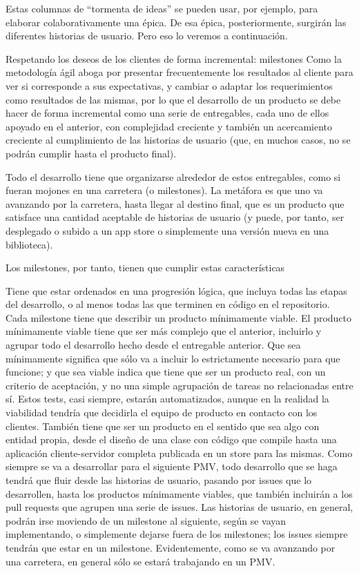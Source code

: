 Estas columnas de “tormenta de ideas” se pueden usar, por ejemplo, para elaborar colaborativamente una épica. De esa épica, posteriormente, surgirán las diferentes historias de usuario. Pero eso lo veremos a continuación.

Respetando los deseos de los clientes de forma incremental: milestones
Como la metodología ágil aboga por presentar frecuentemente los resultados al cliente para ver si corresponde a sus expectativas, y cambiar o adaptar los requerimientos como resultados de las mismas, por lo que el desarrollo de un producto se debe hacer de forma incremental como una serie de entregables, cada uno de ellos apoyado en el anterior, con complejidad creciente y también un acercamiento creciente al cumplimiento de las historias de usuario (que, en muchos casos, no se podrán cumplir hasta el producto final).

Todo el desarrollo tiene que organizarse alrededor de estos entregables, como si fueran mojones en una carretera (o milestones). La metáfora es que uno va avanzando por la carretera, hasta llegar al destino final, que es un producto que satisface una cantidad aceptable de historias de usuario (y puede, por tanto, ser desplegado o subido a un app store o simplemente una versión nueva en una biblioteca).

Los milestones, por tanto, tienen que cumplir estas características

Tiene que estar ordenados en una progresión lógica, que incluya todas las etapas del desarrollo, o al menos todas las que terminen en código en el repositorio.
Cada milestone tiene que describir un producto mínimamente viable. El producto mínimamente viable tiene que ser más complejo que el anterior, incluirlo y agrupar todo el desarrollo hecho desde el entregable anterior.
Que sea mínimamente significa que sólo va a incluir lo estrictamente necesario para que funcione; y que sea viable indica que tiene que ser un producto real, con un criterio de aceptación, y no una simple agrupación de tareas no relacionadas entre sí. Estos tests, casi siempre, estarán automatizados, aunque en la realidad la viabilidad tendría que decidirla el equipo de producto en contacto con los clientes.
También tiene que ser un producto en el sentido que sea algo con entidad propia, desde el diseño de una clase con código que compile hasta una aplicación cliente-servidor completa publicada en un store para las mismas.
Como siempre se va a desarrollar para el siguiente PMV, todo desarrollo que se haga tendrá que fluir desde las historias de usuario, pasando por issues que lo desarrollen, hasta los productos mínimamente viables, que también incluirán a los pull requests que agrupen una serie de issues. Las historias de usuario, en general, podrán irse moviendo de un milestone al siguiente, según se vayan implementando, o simplemente dejarse fuera de los milestones; los issues siempre tendrán que estar en un milestone. Evidentemente, como se va avanzando por una carretera, en general sólo se estará trabajando en un PMV.

